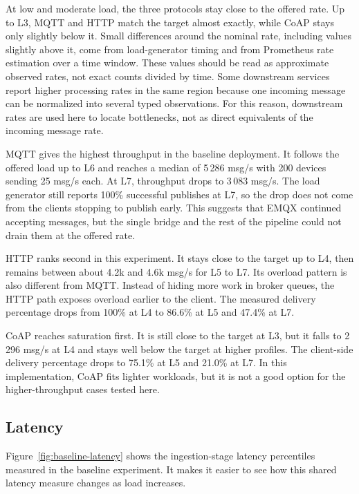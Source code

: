 At low and moderate load, the three protocols stay close to the offered rate. Up to L3, \gls{MQTT} and \gls{HTTP} match the target almost exactly, while \gls{CoAP} stays only slightly below it. Small differences around the nominal rate, including values slightly above it, come from load-generator timing and from Prometheus rate estimation over a time window. These values should be read as approximate observed rates, not exact counts divided by time. Some downstream services report higher processing rates in the same region because one incoming message can be normalized into several typed observations. For this reason, downstream rates are used here to locate bottlenecks, not as direct equivalents of the incoming message rate.

\gls{MQTT} gives the highest throughput in the baseline deployment. It follows the offered load up to L6 and reaches a median of 5\,286 msg/s with 200 devices sending 25 msg/s each. At L7, throughput drops to 3\,083 msg/s. The load generator still reports 100\% successful publishes at L7, so the drop does not come from the clients stopping to publish early. This suggests that EMQX continued accepting messages, but the single bridge and the rest of the pipeline could not drain them at the offered rate.

\gls{HTTP} ranks second in this experiment. It stays close to the target up to L4, then remains between about 4.2k and 4.6k msg/s for L5 to L7. Its overload pattern is also different from \gls{MQTT}. Instead of hiding more work in broker queues, the \gls{HTTP} path exposes overload earlier to the client. The measured delivery percentage drops from 100\% at L4 to 86.6\% at L5 and 47.4\% at L7.

\gls{CoAP} reaches saturation first. It is still close to the target at L3, but it falls to 2\,296 msg/s at L4 and stays well below the target at higher profiles. The client-side delivery percentage drops to 75.1\% at L5 and 21.0\% at L7. In this implementation, \gls{CoAP} fits lighter workloads, but it is not a good option for the higher-throughput cases tested here.

\subsection{Latency}
\label{subsec:EvalBaselineLatency}

Figure~\ref{fig:baseline-latency} shows the ingestion-stage latency percentiles measured in the baseline experiment. It makes it easier to see how this shared latency measure changes as load increases.

